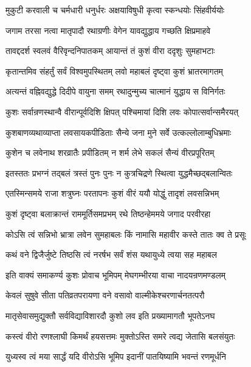 \twolineshloka
{मुकुटी करवाली च चर्मधारी धनुर्धरः}
{अक्षयाविषुधी कृत्वा स्कन्धयोः सिंहवीर्ययोः}%

\twolineshloka
{जगाम तरसा नत्वा मातृपादौ रथाग्रणीः}
{वेगेन यावद्युद्धाय गच्छति क्षिप्रमाहवे}%

\twolineshloka
{तावद्ददर्श स्वलवं वैरिवृन्दनिपातकम्}
{आयान्तं तं कुशं वीरा ददृशुः सुमहाभटाः}%

\twolineshloka
{कृतान्तमिव संहर्तुं सर्वं विश्वमुपस्थितम्}
{लवो महाबलं दृष्ट्वा कुशं भ्रातरमागतम्}%

\twolineshloka
{अत्यन्तं वह्निवद्युद्धे दिदीपे वायुना समम्}
{रथादुन्मुच्य चात्मानं युद्धाय स विनिर्गतः}%

\twolineshloka
{कुशः सर्वान्रणस्थान्वै वीरान्पूर्वदिशि क्षिपत्}
{पश्चिमायां दिशि लवः कोपात्सर्वान्समैरयत्}%

\twolineshloka
{कुशबाणव्यथाव्याप्ता लवसायकपीडिताः}
{सैन्ये जना मुने सर्वे उत्कल्लोलाम्बुधिभ्रमाः}%

\twolineshloka
{कुशेन च लवेनाथ शरव्रातैः प्रपीडितम्}
{न शर्म लेभे सकलं सैन्यं वीरप्रपूरितम्}%

\twolineshloka
{इतस्ततः प्रभग्नं तद्बलं त्रस्तं पुनः पुनः}
{न कुत्रचिद्रणे स्थित्वा युद्धमैच्छद्बलान्वितः}%

\twolineshloka
{एतस्मिन्समये राजा शत्रुघ्नः परतापनः}
{कुशं वीरं ययौ योद्धुं तादृशं लवसन्निभम्}%

\twolineshloka
{कुशं दृष्ट्वा बलाक्रान्तं राममूर्तिसमप्रभम्}
{रथे तिष्ठन्हेममये जगाद परवीरहा}%


\twolineshloka
{कोऽसि त्वं सन्निभो भ्रात्रा लवेन सुमहाबलः}
{किं नामासि महावीर कस्ते तातः क्व ते प्रसूः}%

\twolineshloka
{कथं वने द्विजैर्जुष्टे तिष्ठसि त्वं नरर्षभ}
{सर्वं शंस यथायुध्ये त्वया सह महाबल}%

\twolineshloka
{इति वाक्यं समाकर्ण्य कुशः प्रोवाच भूमिपम्}
{मेघगम्भीरया वाचा नादयन्रणमण्डलम्}%

\twolineshloka
{केवलं सुषुवे सीता पतिव्रतपरायणा}
{वने वसावो वाल्मीकेश्चरणार्चनतत्परौ}%

\twolineshloka
{मातृसेवासमुद्युक्तौ सर्वविद्याविशारदौ}
{कुशो लव इति प्रख्यामागतौ भूपतेऽनघ}%

\twolineshloka
{कस्त्वं वीरो रणश्लाघी किमर्थं हयसत्तमः}
{मुक्तोऽस्ति समरे त्वद्य जेतासि बलसंयुतः}%

\twolineshloka
{युध्यस्व त्वं मया सार्द्धं यदि वीरोऽसि भूमिप}
{इदानीं पातयिष्यामि भवन्तं रणमूर्धनि}%

